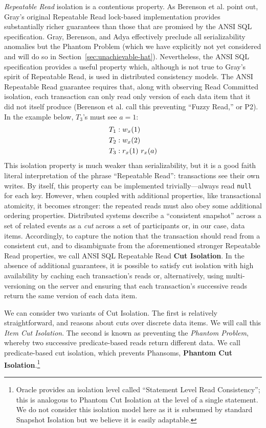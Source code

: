 \textit{Repeatable Read} isolation is a contentious property. As
Berenson et al. point out, Gray's original Repeatable Read lock-based
implementation provides substantially richer guarantees than those
that are promised by the ANSI SQL specification. Gray, Berenson, and
Adya effectively preclude all serializability anomalies but the
Phantom Problem (which we have explicitly not yet considered and will
do so in Section~\ref{sec:unachievable-hat}). Nevertheless, the ANSI
SQL specification provides a useful property which, although is not
true to Gray's spirit of Repeatable Read, is used in distributed
consistency models. The ANSI Repeatable Read guarantee requires that,
along with observing Read Committed isolation, each transaction can
only read only version of each data item that it did not itself
produce (Berenson et al. call this preventing ``Fuzzy Read,'' or
P2). In the example below, $T_3$'s must see $a=1$:
\begin{align*}
\small
T_1 &: w_x(1)
\\T_2 &: w_x(2)
\\T_3 &: r_x(1)~r_x(a)
\end{align*}
This isolation property is much weaker than serializability, but it is
a good faith literal interpretation of the phrase ``Repeatable Read'':
transactions see their own writes. By itself, this property can be
implemented trivially---always read \texttt{null} for each
key. However, when coupled with additional properties, like
transactional atomicity, it becomes stronger: the repeated reads must
also obey some additional ordering properties. Distributed systems
describe a ``consistent snapshot'' across a set of related events as a
\textit{cut} across a set of participants or, in our case, data
items. Accordingly, to capture the notion that the transaction should
read from a consistent cut, and to disambiguate from the
aforementioned stronger Repeatable Read properties, we call ANSI SQL
Repeatable Read \textbf{Cut Isolation}. In the absence of additional
guarantees, it is possible to satisfy cut isolation with high
availability by caching each transaction's reads or, alternatively,
using multi-versioning on the server and ensuring that each
transaction's successive reads return the same version of each data
item.

We can consider two variants of Cut Isolation. The first is relatively
straightforward, and reasons about cuts over discrete data items. We
will call this \textit{Item Cut Isolation}. The second is known as
preventing the \textit{Phantom Problem}, whereby two successive
predicate-based reads return different data. We call predicate-based
cut isolation, which prevents Phansoms, \textbf{Phantom Cut
  Isolation}.\footnote{Oracle provides an isolation level called
  ``Statement Level Read Consistency''; this is analogous to Phantom
  Cut Isolation at the level of a single statement. We do not consider
  this isolation model here as it is subsumed by standard Snapshot
  Isolation but we believe it is easily adaptable.}

